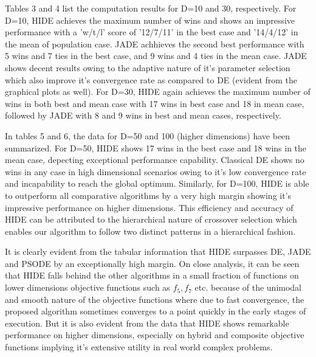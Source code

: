 Tables 3 and 4 list the computation results for D=10 and 30, respectively. For D=10, HIDE achieves the maximum number of wins and shows an impressive performance with a 'w/t/l' score of '12/7/11' in the best case and '14/4/12' in the mean of population case. JADE achhieves the second best performance with 5 wins and 7 ties in the best case, and 9 wins and 4 ties in the mean case. JADE shows decent results owing to the adaptive nature of it's parameter selection which also improve it's convergence rate as compared to DE (evident from the graphical plots as well). For D=30, HIDE again achieves the maximum number of wins in both best and mean case with 17 wins in best case and 18 in mean case, followed by JADE with 8 and 9 wins in best and mean cases, respectively.

In tables 5 and 6, the data for D=50 and 100 (higher dimensions) have been summarized. For D=50, HIDE shows 17 wins in the best case and 18 wins in the mean case, depecting exceptional performance capability. Classical DE shows no wins in any case in high dimensional scenarios owing to it's low convergence rate and incapability to reach the global optimum. Similarly, for D=100, HIDE is able to outperform all comparative algorithms by a very high margin showing it's impressive performance on higher dimensions. This efficiency and accuracy of HIDE can be attributed to the hierarchical nature of crossover selection which enables our algorithm to follow two distinct patterns in a hierarchical fashion.

It is clearly evident from the tabular information that HIDE surpasses DE, JADE and PSODE by an exceptionally high margin. On close analysis, it can be seen that HIDE falls behind the other algorithms in a small fraction of functions on lower dimensions objective functions such as $f_5, f_7$ etc. because of the unimodal and smooth nature of the objective functions where due to fast convergence, the proposed algorithm sometimes converges to a point quickly in the early stages of execution. But it is also evident from the data that HIDE shows remarkable performance on higher dimensions, especially on hybrid and composite objective functions implying it's extensive utility in real world complex problems.

